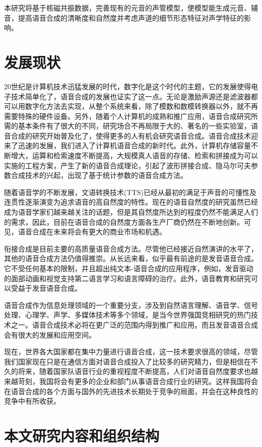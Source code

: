 本研究将基于核磁共振数据，完善现有的元音的声管模型，使模型能生成元音、辅音，提高语音合成的清晰度和自然度并考虑声道的细节形态特征对声学特征的影响。

\section{发展现状}

20世纪是计算机技术迅猛发展的时代，数字化是这个时代的主题，它的发展使得电子技术简单化了，语音合成的发展也证实了这一点。无论是激励声源还是滤波器都可以用数字化方法去实现，从整个系统来看，除了模数和数模转换器以外，就不再需要特殊的硬件设备。另外，随着个人计算机的成熟和推广应用，语音合成研究所需的基本条件有了很大的不同，研究场合不再局限于大的、著名的一些实验室，语音合成的研究开始普及化了，使得更多的人有机会研究语音合成。语音合成技术迎来了迅速的发展，我们进入了计算机语音合成的新时代。此外，计算机存储容量不断增大，运算和检索速度不断提高，大规模真人语音的存储、检索和拼接成为可以实施的工程方案，产生了新的语音合成理论，引起了波形拼接合成、隐马尔可夫参数合成技术的兴起，出现了基于统计参数的语音合成方法。


随着语音学的不断发展，文语转换技术(TTS)已经从最初的满足于声音的可懂性及连贯性逐渐演变为追求语音的高自然度的特性。现在的语音自然度的研究虽然已经成为语音学家们越来越关注的话题，但是其自然度所达到的程度仍然不能满足人们的需求，因此，目前在语音合成的自然度方面各生产厂商仍然在不断地创新。可见，语音合成在未来将会有更大的商业市场和机遇。


衔接合成是目前主要的高质量语音合成方法。尽管他已经接近自然演讲的水平了，其他的语音合成方法仍值得推崇。从长远来看，似乎最有前途的是发音语音合成。它不受任何基本的限制，并且超出纯文本-语音合成的应用程序，例如，发音驱动的面部动画和视觉支持第二语言学习和语言障碍的治疗。此外，语音教育和研究可以受益于发音语音合成。


语音合成作为信息处理领域的一个重要分支，涉及到自然语言理解、语音学、信号处理、心理学、声学、多媒体技术等多个领域，是当今世界强国竞相研究的热门技术之一。语音合成技术必将在更广泛的范围内得到推广和应用。而且发音语音合成会有很大的发展和应用空间。


现在，世界各大国家都在集中力量进行语音合成，这一技术要求很高的领域，尽管我们国家现在只是在通信方面对语音合成投入了比较多的研究精力，但是相信在不久的将来，随着国家队语音行业的重视程度不断提高，人们对语音自然度要求也越来越苛刻，我国将会有更多的企业和部门从事语音合成行业的研究。这样我国将会在语音合成的各个方面与国外的先进技术长期处于竞争的局面，并会在这种良性的竞争中有所收获。


\section{本文研究内容和组织结构}

